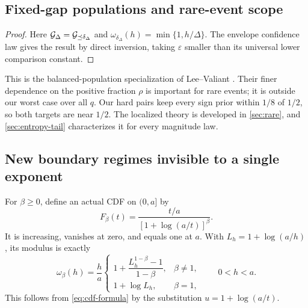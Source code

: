\subsection{Fixed-gap populations and rare-event scope}
\begin{proof}
Here $\mathcal G_\Delta=\mathcal G_{\preceq\delta_\Delta}$ and
$\omega_{\delta_\Delta}(h)=\min\{1,h/\Delta\}$.
The envelope confidence law gives the result by direct inversion, taking
$\varepsilon$ smaller than its universal lower comparison constant.
\end{proof}
This is the balanced-population specialization of Lee--Valiant
\cite{leevaliant}. Their finer dependence on the positive fraction $\rho$
is important for rare events; it is outside our worst case over all $q$.
Our hard pairs keep every sign prior within $1/8$ of $1/2$, so both targets
are near $1/2$. The localized theory is developed in \cref{sec:rare}, and
\cref{sec:entropy-tail} characterizes it for every magnitude law.

\subsection{New boundary regimes invisible to a single exponent}
For $\beta\ge0$, define an actual CDF on $(0,a]$ by
\begin{equation}\label{eq:log-cdf}
 F_\beta(t)=\frac{t/a}{[1+\log(a/t)]^\beta}.
\end{equation}
It is increasing, vanishes at zero, and equals one at $a$.
With $L_h=1+\log(a/h)$, its modulus is exactly
\begin{equation}\label{eq:log-modulus}
 \omega_\beta(h)=\frac ha
 \begin{cases}
  1+\dfrac{L_h^{1-\beta}-1}{1-\beta},&\beta\ne1,\\[6pt]
  1+\log L_h,&\beta=1,
 \end{cases}\qquad 0<h<a.
\end{equation}
This follows from \eqref{eq:cdf-formula} by the substitution
$u=1+\log(a/t)$.

